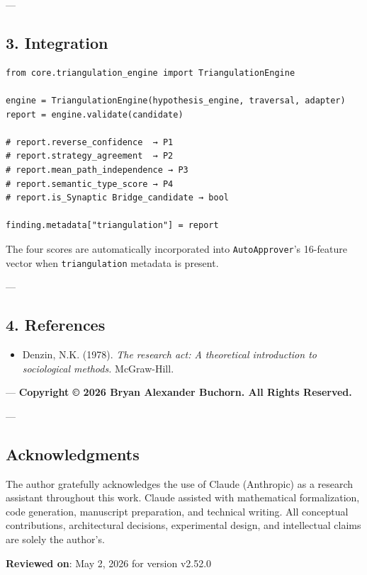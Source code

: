 ---

\subsection{3. Integration}

\begin{lstlisting}
from core.triangulation_engine import TriangulationEngine

engine = TriangulationEngine(hypothesis_engine, traversal, adapter)
report = engine.validate(candidate)

# report.reverse_confidence  → P1
# report.strategy_agreement  → P2
# report.mean_path_independence → P3
# report.semantic_type_score → P4
# report.is_Synaptic Bridge_candidate → bool

finding.metadata["triangulation"] = report
\end{lstlisting}

The four scores are autom\-atically incor\-porated into \texttt{AutoApprover}'s 16-feature vector when \texttt{triangulation} metadata is present.

---

\subsection{4. References}

\begin{itemize}
\item [denzin\-1978\-research] Denzin, N.K. (1978). \textit{The research act: A theoretical intro\-duction to socio\-logical methods.} McGraw-Hill.

\end{itemize}
---
\textbf{Copyright © 2026 Bryan Alexander Buchorn. All Rights Reserved.}

---
\subsection{Acknow\-ledgments}

The author gratefully ackno\-wledges the use of Claude (Anthropic) as a research assistant throughout this work. Claude assisted with mathe\-matical forma\-lization, code generation, manuscript preparation, and technical writing. All conceptual contr\-ibutions, archi\-tectural decisions, exper\-imental design, and intel\-lectual claims are solely the author's.

\textbf{Reviewed on}: May 2, 2026 for version v2.52.0
